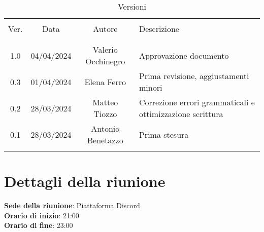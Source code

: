 \documentclass[italian,12pt]{article} %
\begin{document}


\newpage



\begin{table}[!h]
	\caption{Versioni}
	\begin{center}
		\begin{tabular}{ c c c p{9cm} }
			\hline                                                                                            \\[-2ex]
			Ver. & Data       & Autore            & Descrizione                                               \\
			\\[-2ex] \hline \\[-1.5ex]
			1.0  & 04/04/2024 & Valerio Occhinegro & Approvazione documento \\
			0.3  & 01/04/2024 & Elena Ferro       & Prima revisione, aggiustamenti minori                     \\
			0.2  & 28/03/2024 & Matteo Tiozzo     & Correzione errori grammaticali e ottimizzazione scrittura \\
			0.1  & 28/03/2024 & Antonio Benetazzo & Prima stesura                                             \\
			\\[-1.5ex] \hline
		\end{tabular}
	\end{center}
\end{table}

\newpage

\tableofcontents

\newpage

\section{Dettagli della riunione}


\textbf{Sede della riunione}: Piattaforma Discord\\
\textbf{Orario di inizio}: 21:00\\
\textbf{Orario di fine}: 23:00\\
\end{document}
